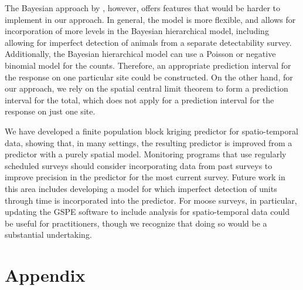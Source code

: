 \documentclass[]{interact}
\theoremstyle{plain}%
\theoremstyle{definition}
\theoremstyle{remark}
\begin{document}
The Bayesian approach by \citet{schmidt2022bayesian}, however, offers
features that would be harder to implement in our approach. In general,
the model is more flexible, and allows for incorporation of more levels
in the Bayesian hierarchical model, including allowing for imperfect
detection of animals from a separate detectability survey. Additionally,
the Bayesian hierarchical model can use a Poisson or negative binomial
model for the counts. Therefore, an appropriate prediction interval for
the response on one particular site could be constructed. On the other
hand, for our approach, we rely on the spatial central limit theorem to
form a prediction interval for the total, which does not apply for a
prediction interval for the response on just one site.

We have developed a finite population block kriging predictor for
spatio-temporal data, showing that, in many settings, the resulting
predictor is improved from a predictor with a purely spatial model.
Monitoring programs that use regularly scheduled surveys should consider
incorporating data from past surveys to improve precision in the
predictor for the most current survey. Future work in this area includes
developing a model for which imperfect detection of units through time
is incorporated into the predictor. For moose surveys, in particular,
updating the GSPE software to include analysis for spatio-temporal data
could be useful for practitioners, though we recognize that doing so
would be a substantial undertaking.

\section{Appendix} \label{section:appendix}
\end{document}
